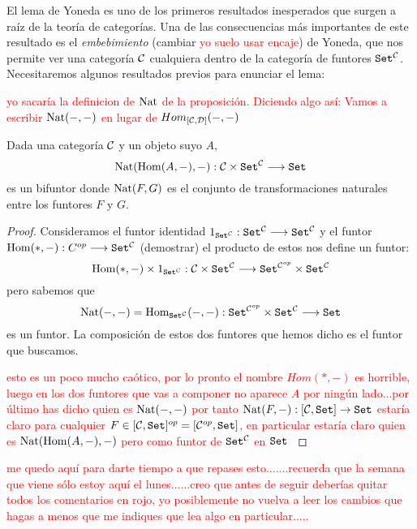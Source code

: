 El lema de Yoneda es uno de los primeros resultados
inesperados que surgen a raíz de la teoría de categorías. Una
de las consecuencias más importantes de este resultado es
el \textit{embebimiento} (cambiar \textcolor{red}{yo suelo usar encaje}) de Yoneda, que nos permite
ver una categoría $\mathcal{C}$ cualquiera dentro de la categoría de
funtores $\texttt{Set}^{\mathcal{C}}$. Necesitaremos algunos resultados
previos para enunciar el lema:

\textcolor{red}{yo sacaría la definicion de $\operatorname{Nat}$ de la proposición. Diciendo algo así: Vamos a escribir $\operatorname{Nat}(-,-)$ en lugar de $Hom_{[\mathcal{C},\mathcal{D}]}(-,-)$}

\begin{proposition*}
  Dada una categoría $\mathcal{C}$ y un objeto suyo
  $A$,
  $$\operatorname{Nat}(\operatorname{Hom}(A, -), -) : \mathcal{C} \times \texttt{Set}^{\mathcal{C}}\longrightarrow \texttt{Set}$$
  es un bifuntor donde $\operatorname{Nat}(F, G)$ es el conjunto de transformaciones
  naturales entre los funtores $F$ y $G$.
\end{proposition*}
\begin{proof}
  Consideramos el funtor identidad
  $1_{\texttt{Set}^{\mathcal{C}}} :\texttt{Set}^{\mathcal{C}}\longrightarrow \texttt{Set}^{\mathcal{C}}$ y el funtor
  $\operatorname{Hom}(*, -) : C^{op}\longrightarrow \texttt{Set}^{\mathcal{C}}$ (demostrar)
  el producto de estos nos define un funtor:
  $$\operatorname{Hom}(*, -)\times 1_{\texttt{Set}^{\mathcal{C}}} :
  \mathcal{C}\times \texttt{Set}^{\mathcal{C}}\longrightarrow  \texttt{Set}^{\mathcal{C}^{op}} \times \texttt{Set}^{\mathcal{C}}$$
  pero sabemos que
  $$\operatorname{Nat}(-, -) = \operatorname{Hom}_{\texttt{Set}^{\mathcal{C}}}(-, -) :
    \texttt{Set}^{\mathcal{C}^{op}}\times\texttt{Set}^{\mathcal{C}}\longrightarrow \texttt{Set}$$
    es un funtor. La composición de estos dos funtores
    que hemos dicho es el funtor que buscamos.

 \textcolor{red}{esto es un poco mucho caótico, por lo pronto el nombre $Hom(*,-) $ es horrible, luego en los dos funtores que vas a componer no aparece $A$ por ningún lado...por último has dicho quien es $\operatorname{Nat}(-,-)$ por tanto $\operatorname{Nat}(F,-):[\mathcal{C} ,\texttt{Set}]\rightarrow \texttt{Set}$ estaría claro para cualquier $F\in [\mathcal{C} ,\texttt{Set}]^{op}=[\mathcal{C}^{op},\texttt{Set}]$, en particular estaría claro quien es $\operatorname{Nat}(\operatorname{Hom}(A, -), -)$ pero como funtor de  $\texttt{Set}^{\mathcal{C}}$ en $\texttt{Set}$  }
\end{proof}

\textcolor{red}{me quedo aquí para darte tiempo a que repases esto.......recuerda que la semana que viene sólo estoy aquí el lunes......creo que antes de seguir deberías quitar todos los comentarios en rojo, yo posiblemente no vuelva a leer los cambios que hagas a menos que me indiques que lea algo en particular.....}



